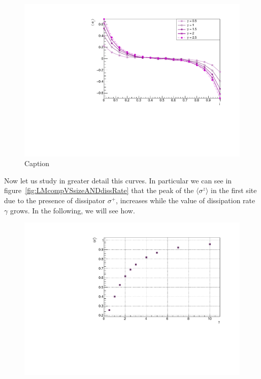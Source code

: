 \begin{figure}[H]
    \centering
    \includegraphics[scale=0.7]{Figures/16sites/16sites_LMvsGamma.pdf}
    \caption{Caption}
    \label{fig:my_label}
\end{figure}

Now let us study in greater detail this curves. In particular we can see in figure~\ref{fig:LMcompVSsizeANDdissRate} that the peak of the $\langle \sigma^z \rangle$ in the first site due to the presence of dissipator $\sigma^+$, increases while the value of dissipation rate $\gamma$ grows. In the following, we will see how.

\begin{figure}[H]
    \centering
    \includegraphics[scale=0.7]{Figures/8sites_PeakLMvsGamma_J1051.pdf}
    \caption{}
    \label{fig:PeakLMvsGamma_J1051}
\end{figure}


